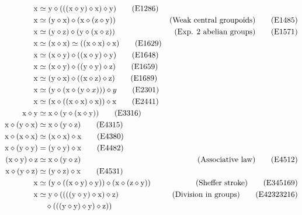 \begin{align}
        \x &\formaleq \y \op (((\x \op \y) \op \x) \op \y) \label{eq1286}\tag{E1286} \\
        \x &\formaleq (\y \op \x) \op (\x \op (\z \op \y)) & \hbox{(Weak central groupoids)}\label{eq1485}\tag{E1485} \\
        \x &\formaleq (\y \op \z) \op (\y \op (\x \op \z)) & \hbox{(Exp. $2$ abelian groups)} \label{eq1571}\tag{E1571} \\
        \x &\formaleq (\x \op \x) \formaleq ((\x \op \x) \op \x) \label{eq1629}\tag{E1629} \\
        \x &\formaleq (\x \op \y) \op ((\x \op \y) \op \y) \label{eq1648}\tag{E1648} \\
        \x &\formaleq (\x \op \y) \op ((\y \op \y) \op \z) \label{eq1659}\tag{E1659} \\
        \x &\formaleq (\y \op \x) \op ((\x \op \z) \op \z) \label{eq1689}\tag{E1689} \\
        \x &\formaleq (\y \op (\x \op (\y \op x))) \op y \label{eq2301}\tag{E2301} \\
        \x &\formaleq (\x \op ((\x \op \x) \op \x)) \op \x \label{eq2441}\tag{E2441} \\
        \x \op \y &\formaleq \x \op (\y \op (\x \op \y)) \label{eq3316}\tag{E3316} \\
        \x \op (\y \op \x) &\formaleq \x \op (\y \op \z) \label{eq4315}\tag{E4315} \\
        \x \op (\x \op \x) &\formaleq (\x \op \x) \op \x \label{eq4380}\tag{E4380} \\
        \x \op (\y \op \y) &= (\y \op \y) \op \x \label{eq4482}\tag{E4482} \\
        (\x \op \y) \op \z &\formaleq \x \op (\y \op \z) &\hbox{(Associative law)} \label{eq4512}\tag{E4512}\\
        \x \op (\y \op \z) &\formaleq (\y \op \z) \op \x \label{eq4531}\tag{E4531} \\
        \x &\formaleq (\y \op ((\x \op \y) \op \y)) \op (\x \op (\z \op \y)) & \hbox{(Sheffer stroke)} \label{eq345169}\tag{E345169} \\
        \x &\formaleq \y \op ((((\y \op \y) \op \x) \op \z) & \hbox{(Division in groups)} \label{eq42323216}\tag{E42323216} \\
        & \quad  \op (((\y \op \y) \op \y) \op \z)) \nonumber
\end{align}

